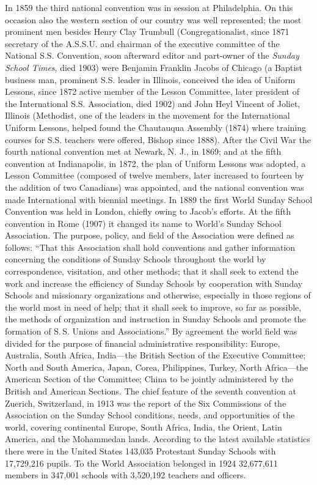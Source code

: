 In 1859 the third national convention was in session at Philadelphia. On this occasion also the western section of our country was well represented; the most prominent men besides Henry Clay Trumbull (Congregationalist, since 1871 secretary of the A.S.S.U. and chairman of the executive committee of the National S.S. Convention, soon afterward editor and part-owner of the \emph{Sunday School Times}, died 1903) were Benjamin Franklin Jacobs of Chicago (a Baptist business man, prominent S.S. leader in Illinois, conceived the idea of Uniform Lessons, since 1872 active member of the Lesson Committee, later president of the International S.S. Association, died 1902) and John Heyl Vincent of Joliet, Illinois (Methodist, one of the leaders in the movement for the International Uniform Lessons, helped found the Chautauqua Assembly (1874) where training courses for S.S. teachers were offered, Bishop since 1888). After the Civil War the fourth national convention met at Newark, N. J., in 1869; and at the fifth convention at Indianapolis, in 1872, the plan of Uniform Lessons was adopted, a Lesson Committee (composed of twelve members, later increased to fourteen by the addition of two Canadians) was appointed, and the national convention was made International with biennial meetings. In 1889 the first World Sunday School Convention was held in London, chiefly owing to Jacob’s efforts. At the fifth convention in Rome (1907) it changed its name to World’s Sunday School Association. The purpose, policy, and field of the Association were defined as follows: “That this Association shall hold conventions and gather information concerning the conditions of Sunday Schools throughout the world by correspondence, visitation, and other methods; that it shall seek to extend the work and increase the efficiency of Sunday Schools by cooperation with Sunday Schools and missionary organizations and otherwise, especially in those regions of the world most in need of help; that it shall seek
to improve, so far as possible, the methods of organization and instruction in Sunday Schools and promote the formation of S.\,S. Unions and Associations.” By agreement the world field was divided for the purpose of financial administrative responsibility: Europe, Australia, South Africa, India—the British Section of the Executive Committee; North and South America, Japan, Corea, Philippines, Turkey, North Africa—the American Section of the Committee; China to be jointly administered by the British and American Sections. The chief feature of the seventh convention at Zuerich, Switzerland, in 1913 was the report of the Six Commissions of the Association on the Sunday School conditions, needs, and opportunities of the world, covering continental Europe, South Africa, India, the Orient, Latin America, and the Mohammedan lands. According to the latest available statistics there were in the United States 143,035 Protestant Sunday Schools with 17,729,216 pupils. To the World Association belonged in 1924 32,677,611 members in 347,001 schools with 3,520,192 teachers and officers.

